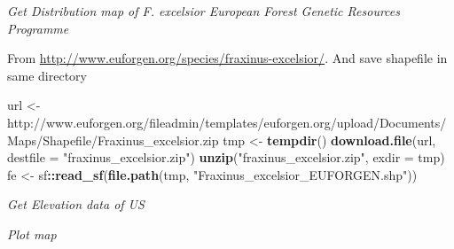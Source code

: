 \documentclass[3p]{elsarticle} %
\newenvironment{Shaded}{\begin{snugshade}}{\end{snugshade}}
\newcommand{\DataTypeTok}[1]{\textcolor[rgb]{0.13,0.29,0.53}{#1}}
\newcommand{\KeywordTok}[1]{\textcolor[rgb]{0.13,0.29,0.53}{\textbf{#1}}}
\newcommand{\NormalTok}[1]{#1}
\newcommand{\OperatorTok}[1]{\textcolor[rgb]{0.81,0.36,0.00}{\textbf{#1}}}
\newcommand{\StringTok}[1]{\textcolor[rgb]{0.31,0.60,0.02}{#1}}
\begin{document}
\emph{Get Distribution map of F. excelsior European Forest Genetic
Resources Programme}

From \url{http://www.euforgen.org/species/fraxinus-excelsior/}. And save
shapefile in same directory

\begin{Shaded}
\begin{Highlighting}[]
\NormalTok{url <{-}}\StringTok{ \textquotesingle{}http://www.euforgen.org/fileadmin/templates/euforgen.org/upload/Documents/Maps/Shapefile/Fraxinus\_excelsior.zip\textquotesingle{}}
\NormalTok{tmp <{-}}\StringTok{ }\KeywordTok{tempdir}\NormalTok{()}
\KeywordTok{download.file}\NormalTok{(url, }\DataTypeTok{destfile =} \StringTok{"fraxinus\_excelsior.zip"}\NormalTok{)}
\KeywordTok{unzip}\NormalTok{(}\StringTok{"fraxinus\_excelsior.zip"}\NormalTok{, }\DataTypeTok{exdir =}\NormalTok{ tmp)}
\NormalTok{fe <{-}}\StringTok{ }\NormalTok{sf}\OperatorTok{::}\KeywordTok{read\_sf}\NormalTok{(}\KeywordTok{file.path}\NormalTok{(tmp, }\StringTok{"Fraxinus\_excelsior\_EUFORGEN.shp"}\NormalTok{))}
\end{Highlighting}
\end{Shaded}

\emph{Get Elevation data of US}

\begin{Shaded}
\end{Shaded}

\emph{Plot map}
\end{document}
